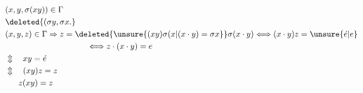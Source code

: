 \[
\begin{aligned}
&(x,y,\sigma(xy))\in\Gamma\\
&\deleted{(\sigma y,\sigma x.}\\
&(x,y,z)\in\Gamma\Rightarrow z=\deleted{\unsure{(xy)\sigma(x|(x\cdot y)=\sigma x}}\sigma(x\cdot y)
\Longleftrightarrow(x\cdot y)z=\unsure{\acute e|e}\\
&\hspace{10em}\Longleftrightarrow z\cdot(x\cdot y)=e\\
&\Updownarrow\quad xy=\acute e\\
&\Updownarrow\quad(xy)z=z\\
&\phantom{\Updownarrow\quad}z(xy)=z
\end{aligned}
\]
